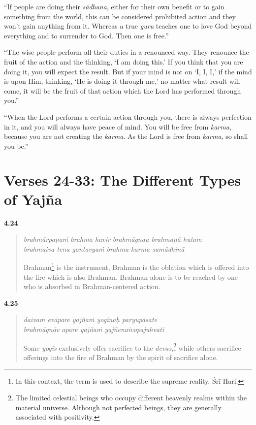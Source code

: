 \enquote{If people are doing their \textit{sādhana}, either for their own benefit or to gain something from the world, this can be considered prohibited action and they won’t gain anything from it. Whereas a true \textit{guru} teaches one to love God beyond everything and to surrender to God. Then one is free.}

\enquote{The wise people perform all their duties in a renounced way. They renounce the fruit of the action and the thinking, \enquote{I am doing this.} If you think that you are doing it, you will expect the result. But if your mind is not on \enquote{I, I, I,} if the mind is upon Him, thinking, \enquote{He is doing it through me,} no matter what result will come, it will be the fruit of that action which the Lord has performed through you.}

\enquote{When the Lord performs a certain action through you, there is always perfection in it, and you will always have peace of mind. You will be free from \textit{karma}, because you are not creating the \textit{karma}. As the Lord is free from \textit{karma}, so shall you be.}

\newpage
\section{Verses 24-33: The Different Types of Yajña}\label{sec-verses-24-33-the-different-types-of-yajna}


\par\noindent\textbf{4.24}\par
\begin{verse}
\textit{brahmārpaṇaṁ brahma havir brahmāgnau brahmaṇā hutam} \\
\textit{brahmaiva tena gantavyaṁ brahma-karma-samādhinā}

\noindent Brahman\footnote{In this context, the term is used to describe the supreme reality, Śrī Hari.} is the instrument, Brahman is the oblation which is offered into the fire which is also Brahman. Brahman alone is to be reached by one who is absorbed in Brahman-centered action.
\end{verse}
\par



\par\noindent\textbf{4.25}\par
\begin{verse}
\textit{daivam evāpare yajñaṁ yoginaḥ paryupāsate} \\
\textit{brahmāgnāv apare yajñaṁ yajñenaivopajuhvati}

\noindent Some \textit{yogīs} exclusively offer sacrifice to the \textit{devas},\footnote{The limited celestial beings who occupy different heavenly realms within the material universe. Although not perfected beings, they are generally associated with positivity.} while others sacrifice offerings into the fire of Brahman by the spirit of sacrifice alone.
\end{verse}
\par




